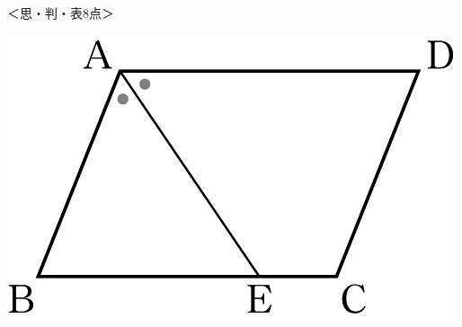 \documentclass[
  12pt,a4paper,lualatex,ja=standard]{bxjsarticle}
\begin{document}
\begin{flushleft}
\begin{multicols}{2}
%
\begin{flushright}%
\footnotesize{＜思・判・表8点＞}%
\end{flushright}%


\columnbreak

\begin{center}
\def\@captype{figure}
\includegraphics{img/image6.png}

\end{center}

\end{multicols}

\vfill

























\end{flushleft}
\end{document}
